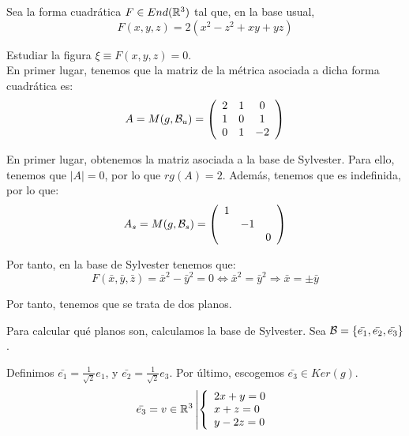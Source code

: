 \begin{ejercicio}
    Sea la forma cuadrática $F\in End(\mathbb{R}^3)$ tal que, en la base usual,
    \begin{equation*}
        F(x,y,z) = 2\left(x^2-z^2+xy+yz\right)
    \end{equation*}

    Estudiar la figura $\xi \equiv F(x,y,z)=0$.\\

    En primer lugar, tenemos que la matriz de la métrica asociada a dicha forma cuadrática es:
    \begin{equation*}
        A = M(g,\mathcal{B}_u) = \left(\begin{array}{ccc}
            2 & 1 & 0\\
            1 & 0 & 1 \\
            0 & 1 & -2
        \end{array}\right)
    \end{equation*}

    En primer lugar, obtenemos la matriz asociada a la base de Sylvester. Para ello, tenemos que $|A|=0$, por lo que $rg(A)=2$. Además, tenemos que es indefinida, por lo que:
    \begin{equation*}
        A_s = M(g,\mathcal{B}_s) = \left(\begin{array}{ccc}
            1 &\\
             & -1 & \\
             &  & 0
        \end{array}\right)
    \end{equation*}

    Por tanto, en la base de Sylvester tenemos que:
    \begin{equation*}
        F(\bar{x}, \bar{y}, \bar{z}) = \bar{x}^2 - \bar{y}^2 = 0 \Longleftrightarrow \bar{x}^2 = \bar{y}^2 \Longrightarrow \bar{x}=\pm \bar{y}
    \end{equation*}

    Por tanto, tenemos que se trata de dos planos.
    
    
    Para calcular qué planos son, calculamos la base de Sylvester. Sea $\mathcal{B}=\{\bar{e_1},\bar{e_2},\bar{e_3}\}$.
    
    Definimos $\bar{e_1} = \frac{1}{\sqrt{2}}e_1$, y $\bar{e_2} = \frac{1}{\sqrt{2}}e_3$. Por último, escogemos $\bar{e_3}\in Ker(g)$.
    \begin{equation*}
        \bar{e_3} = v\in \mathbb{R}^3 \left|\left\{ \begin{array}{l}
            2x+y=0  \\
            x+z=0 \\
            y-2z=0
        \end{array}\right.\right.
    \end{equation*}


\end{ejercicio}

